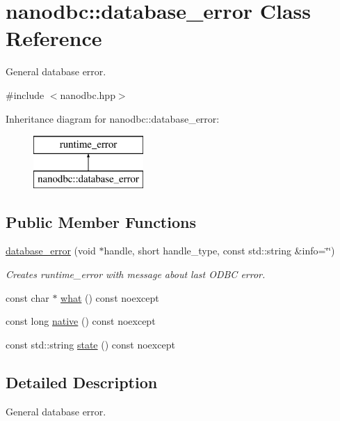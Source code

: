 \hypertarget{classnanodbc_1_1database__error}{}\section{nanodbc\+::database\+\_\+error Class Reference}
\label{classnanodbc_1_1database__error}


General database error.  




{\ttfamily \#include $<$nanodbc.\+hpp$>$}

Inheritance diagram for nanodbc\+::database\+\_\+error\+:\begin{figure}[H]
\begin{center}
\leavevmode
\includegraphics[height=2.000000cm]{classnanodbc_1_1database__error}
\end{center}
\end{figure}
\subsection*{Public Member Functions}
\begin{DoxyCompactItemize}
\item 
\mbox{\hyperlink{classnanodbc_1_1database__error_a5896a7b81053281d045eb9a0e127ef76}{database\+\_\+error}} (void $\ast$handle, short handle\+\_\+type, const std\+::string \&info=\char`\"{}\char`\"{})
\begin{DoxyCompactList}\small\item\em Creates runtime\+\_\+error with message about last O\+D\+BC error. \end{DoxyCompactList}\item 
const char $\ast$ \mbox{\hyperlink{classnanodbc_1_1database__error_a270ae2547cf357ccd95225d957638ae9}{what}} () const noexcept
\item 
const long \mbox{\hyperlink{classnanodbc_1_1database__error_acfa6f22b6405fdab32a5284a696822a2}{native}} () const noexcept
\item 
const std\+::string \mbox{\hyperlink{classnanodbc_1_1database__error_a49ebd24a0598597e12a380e22fec357e}{state}} () const noexcept
\end{DoxyCompactItemize}


\subsection{Detailed Description}
General database error. 

